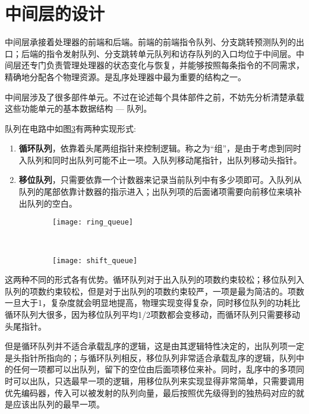 \section{中间层的设计}

中间层承接着处理器的前端和后端。前端的前端指令队列、分支跳转预测队列的出口；后端的指令发射队列、分支跳转单元队列和访存队列的入口均位于中间层。中间层还专门负责管理处理器的状态变化与恢复，并能够按照每条指令的不同需求，精确地分配各个物理资源。是乱序处理器中最为重要的结构之一。

中间层涉及了很多部件单元。不过在论述每个具体部件之前，不妨先分析清楚承载这些功能单元的基本数据结构 --- 队列。

队列在电路中如图\ref{fig:queue}有两种实现形式:
\begin{enumerate}[label=(\alph*)]
	\item \textbf{循环队列}，依靠着头尾两组指针来控制逻辑。称之为``组''，是由于考虑到同时入队列和同时出队列可能不止一项。入队列移动尾指针，出队列移动头指针。
	\item \textbf{移位队列}，只需要依靠一个计数器来记录当前队列中有多少项即可。入队列从队列的尾部依靠计数器的指示进入；出队列项的后面诸项需要向前移位来填补出队列的空白。
\end{enumerate}
\begin{figure}[!htbp]
	\centering
	\begin{subfigure}[b]{0.45\textwidth}
		\texttt{[image: ring\_queue]}
		\caption{}
		\label{fig:ring_queue}
	\end{subfigure}
	~
	\begin{subfigure}[b]{0.45\textwidth}
		\texttt{[image: shift\_queue]}
		\caption{}
		\label{fig:shift_queue}
	\end{subfigure}
	\label{fig:queue}
\end{figure}

这两种不同的形式各有优势。循环队列对于出入队列的项数约束较松；移位队列入队列的项数约束较松，但是对于出队列的项数约束较严，一项是最为简洁的。项数一旦大于1，复杂度就会明显地提高，物理实现变得复杂，同时移位队列的功耗比循环队列大很多，因为移位队列平均1/2项数都会变移动，而循环队列只需要移动头尾指针。

但是循环队列并不适合承载乱序的逻辑，这是由其逻辑特性决定的，出队列项一定是头指针所指向的；与循环队列相反，移位队列非常适合承载乱序的逻辑，队列中的任何一项都可以出队列，留下的空位由后面项移位来补。同时，乱序中的多项同时可以出队，只选最早一项的逻辑，用移位队列来实现显得非常简单，只需要调用优先编码器，传入可以被发射的队列向量，最后按照优先级得到的独热码对应的就是应该出队列的最早一项。


